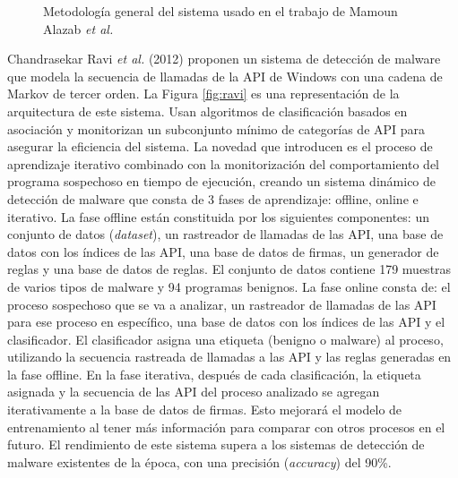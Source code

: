\begin{figure}[h!]
\begin{center}
{}
\end{center}
\caption{Metodología general del sistema usado en el trabajo de Mamoun Alazab \textit{et al.}}
\label{fig:zero}
\end{figure}


Chandrasekar Ravi \textit{et al.} (2012) \cite{ravimalware} proponen un sistema de detección de malware que modela la secuencia de llamadas de la \gls{API} de Windows con una cadena de Markov de tercer orden. La Figura \ref{fig:ravi} es una representación de la arquitectura de este sistema. Usan algoritmos de clasificación basados en asociación y monitorizan un subconjunto mínimo de categorías de \gls{API} para asegurar la eficiencia del sistema. La novedad que introducen es el proceso de aprendizaje iterativo combinado con la monitorización del comportamiento del programa sospechoso en tiempo de ejecución, creando un sistema dinámico de detección de malware que consta de 3 fases de aprendizaje: offline, online e iterativo. La fase offline están constituida por los siguientes componentes: un conjunto de datos (\textit{dataset}), un rastreador de llamadas de las \gls{API}, una base de datos con los índices de las \gls{API}, una base de datos de firmas, un generador de reglas y una base de datos de reglas. El conjunto de datos contiene 179 muestras de varios tipos de malware y 94 programas benignos. La fase online consta de: el proceso sospechoso que se va a analizar, un rastreador de llamadas de las \gls{API} para ese proceso en específico, una base de datos con los índices de las \gls{API} y el clasificador. El clasificador asigna una etiqueta (benigno o malware) al proceso, utilizando la secuencia rastreada de llamadas a las \gls{API} y las reglas generadas en la fase offline. En la fase iterativa, después de cada clasificación, la etiqueta asignada y la secuencia de las \gls{API} del proceso analizado se agregan iterativamente a la base de datos de firmas. Esto mejorará el modelo de entrenamiento al tener más información para comparar con otros procesos en el futuro. El rendimiento de este sistema supera a los sistemas de detección de malware existentes de la época, con una precisión (\textit{accuracy}) del 90\%.

